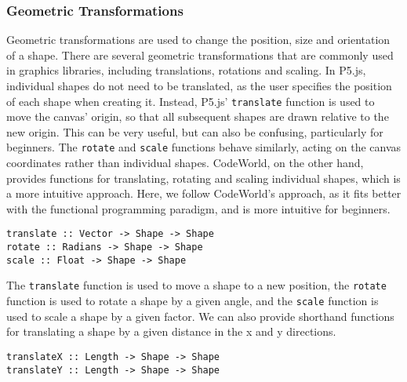 \documentclass[../main.tex]{subfiles}
\begin{document}
            \subsubsection{Geometric Transformations}
                Geometric transformations are used to change the position, size and orientation
                    of a shape.
                There are several geometric transformations that are commonly used in graphics
                    libraries, including translations, rotations and scaling.
                In P5.js, individual shapes do not need to be translated, as the user specifies
                    the position of each shape when creating it.
                Instead, P5.js' \verb|translate| function is used to move the canvas' origin,
                    so that all subsequent shapes are drawn relative to the new origin.
                This can be very useful, but can also be confusing, particularly for beginners.
                The \verb|rotate| and \verb|scale| functions behave similarly, acting on the
                    canvas coordinates rather than individual shapes.
                CodeWorld, on the other hand, provides functions for translating, rotating and
                    scaling individual shapes, which is a more intuitive approach.
                Here, we follow CodeWorld's approach, as it fits better with the functional
                    programming paradigm, and is more intuitive for beginners.

                \begin{lstlisting}[label={lst:geometric}, caption={The geometric transformation functions.}]
translate :: Vector -> Shape -> Shape
rotate :: Radians -> Shape -> Shape
scale :: Float -> Shape -> Shape\end{lstlisting}

                The \verb|translate| function is used to move a shape to a new position, the
                    \verb|rotate| function is used to rotate a shape by a given angle, and the
                    \verb|scale| function is used to scale a shape by a given factor.
                We can also provide shorthand functions for translating a shape by a given
                    distance in the x and y directions.

                \begin{lstlisting}[label={lst:shorthandTransform}, caption={The shorthand translation functions.}]
translateX :: Length -> Shape -> Shape
translateY :: Length -> Shape -> Shape\end{lstlisting}
\end{document}
